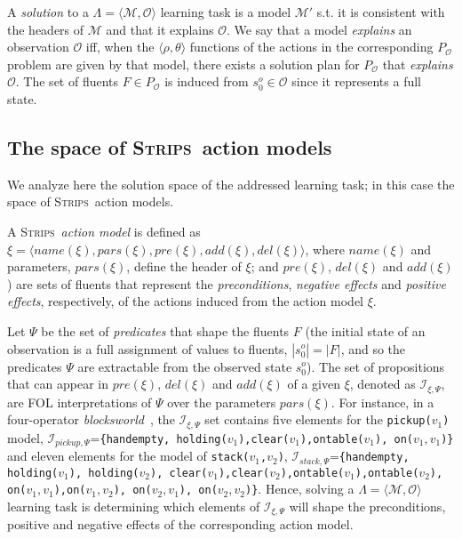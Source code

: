 \documentclass[runningheads]{llncs}
\newcommand{\tup}[1]{{\langle #1 \rangle}}
\newcommand{\strips}{\textsc{Strips}}     %
\begin{document}
A {\em solution} to a $\Lambda=\tup{\mathcal{M},{\mathcal O}}$ learning task is a model $\mathcal{M}'$ s.t. it is consistent with the headers of $\mathcal{M}$ and that it explains $\mathcal{O}$. We say that a model {\em explains} an observation $\mathcal{O}$ iff, when the $\tup{\rho,\theta}$ functions of the actions in the corresponding $P_\mathcal{O}$ problem are given by that model, there exists a solution plan for $P_\mathcal{O}$ that {\em explains} $\mathcal{O}$. The set of fluents $F\in P_\mathcal{O}$ is induced from $s_0^o\in \mathcal{O}$ since it represents a full state.

\subsection{The space of \strips\ action models}
\label{sec:strips-space}
We analyze here the solution space of the addressed learning task; in this case the space of \strips\ action models.

A \strips\ \emph{action model} is defined as $\xi=\tup{name(\xi),pars(\xi),pre(\xi),add(\xi),del(\xi)}$, where $name(\xi)$ and parameters, $pars(\xi)$, define the header of $\xi$; and $pre(\xi)$, $del(\xi)$ and $add(\xi)$) are sets of fluents that represent the {\em preconditions}, {\em negative effects} and {\em positive effects}, respectively, of the actions induced from the action model $\xi$.

Let $\Psi$ be the set of {\em predicates} that shape the fluents $F$ (the initial state of an observation is a full assignment of values to fluents, $|s_0^o|=|F|$, and so the predicates $\Psi$ are extractable from the observed state $s_0^o$). The set of propositions that can appear in $pre(\xi)$, $del(\xi)$ and $add(\xi)$ of a given $\xi$, denoted as ${\mathcal I}_{\xi,\Psi}$, are FOL interpretations of $\Psi$ over the parameters $pars(\xi)$. For instance, in a four-operator {\em blocksworld}~\cite{slaney2001blocks}, the ${\mathcal I}_{\xi,\Psi}$ set contains five elements for the {\small \tt pickup($v_1$)} model, ${\mathcal I}_{pickup,\Psi}$={\small\tt\{handempty, holding($v_1$),clear($v_1$),ontable($v_1$), on($v_1,v_1$)\}} and eleven elements for the model of {\small \tt stack($v_1$,$v_2$)}, ${\mathcal I}_{stack,\Psi}$={\small\tt\{handempty, holding($v_1$), holding($v_2$), clear($v_1$),clear($v_2$),ontable($v_1$),ontable($v_2$), on($v_1,v_1$),on($v_1,v_2$), on($v_2,v_1$), on($v_2,v_2$)\}}. Hence, solving a $\Lambda=\tup{\mathcal{M},{\mathcal O}}$ learning task is determining which elements of ${\mathcal I}_{\xi,\Psi}$ will shape the preconditions, positive and negative effects of the corresponding action model.
\end{document}
